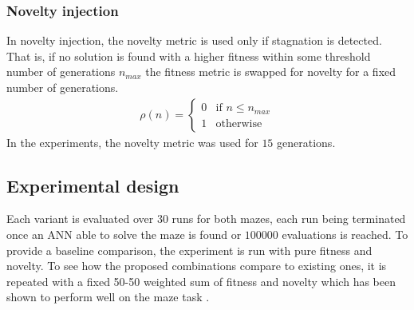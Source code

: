 \subsubsection{Novelty injection}
In novelty injection, the novelty metric is used only if stagnation is detected. That is, if no solution is found with a
higher fitness within some threshold number of generations $n_{max}$ the fitness metric is swapped for novelty for a fixed
number of generations.
\begin{align*}
    \rho(n) =
        \begin{cases}
            0 & \text{if $n \leq n_{max}$}\\
            1 & \text{otherwise}
        \end{cases}
\end{align*}
In the experiments, the novelty metric was used for $15$ generations.

\subsection{Experimental design}
Each variant is evaluated over $30$ runs for both mazes, each run being terminated once an ANN
able to solve the maze is found or $100 000$ evaluations is reached.
To provide a baseline comparison, the experiment is run with pure fitness and novelty. To see how
the proposed combinations compare to existing ones, it is repeated with a fixed 50-50 weighted sum
of fitness and novelty which has been shown to perform well on the maze task \cite{ns_study}.
